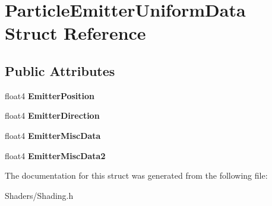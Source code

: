 \hypertarget{structParticleEmitterUniformData}{}\section{Particle\+Emitter\+Uniform\+Data Struct Reference}
\label{structParticleEmitterUniformData}
\subsection*{Public Attributes}
\begin{DoxyCompactItemize}
\item 
\mbox{\label{structParticleEmitterUniformData_a1e6fc7f361b3eef1b1a3ab614c7d8fd1}} 
float4 {\bfseries Emitter\+Position}
\item 
\mbox{\label{structParticleEmitterUniformData_a0304ea1a123a943cf2b02018f64c7622}} 
float4 {\bfseries Emitter\+Direction}
\item 
\mbox{\label{structParticleEmitterUniformData_a98d89fb1c761ad59e719fec1080d2806}} 
float4 {\bfseries Emitter\+Misc\+Data}
\item 
\mbox{\label{structParticleEmitterUniformData_a337cbeb01a56d4675bb19bb328eb930d}} 
float4 {\bfseries Emitter\+Misc\+Data2}
\end{DoxyCompactItemize}


The documentation for this struct was generated from the following file\+:\begin{DoxyCompactItemize}
\item 
Shaders/Shading.\+h\end{DoxyCompactItemize}
